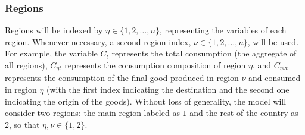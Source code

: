 \documentclass[../thesis.tex]{subfiles}
\begin{document}
	
\subsubsection*{Regions}\label{sec_v6:regions}

	
	
	Regions will be indexed by $\eta \in \{1, 2, \ldots, n\}$, representing the variables of each region. Whenever necessary, a second region index, $\nu \in \{1, 2, \ldots, n\}$, will be used. For example, the variable $C_{t}$ represents the total consumption (the aggregate of all regions), $C_{\eta t}$ represents the consumption composition of region $\eta$, and $C_{\eta \nu t}$ represents the consumption of the final good produced in region $\nu$ and consumed in region $\eta$ (with the first index indicating the destination and the second one indicating the origin of the goods). Without loss of generality, the model will consider two regions: the main region labeled as $1$ and the rest of the country as $2$, so that $\eta, \nu \in \{1, 2\}$.
\end{document}
